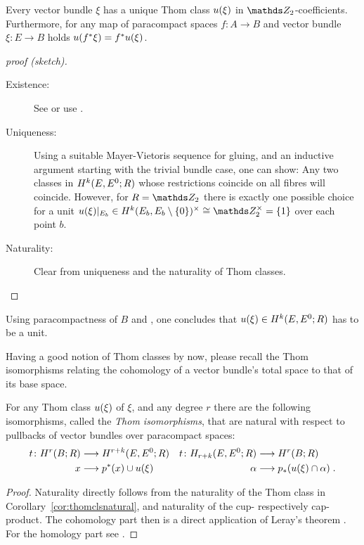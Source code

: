 \begin{Cor}
  Every vector bundle $\xi$ has a unique Thom class ${u}(\xi)$ in
  $\Zmod2$-coefficients.
  Furthermore, for any map of paracompact spaces $f\colon A\to B$ and
  vector bundle $\xi\colon E\to B$ holds ${u}({f}^* \xi) = {f}^* {u}(\xi)$.
  \begin{proof}[proof (sketch)]
    \begin{description}
    \item[Existence:] See \cite[Theorem~4D.10]{hatcher} or use
      \cite[Prop.~17.9.3]{tomdieck}.
    \item[Uniqueness:]
      Using a suitable Mayer-Vietoris sequence for gluing, and an
      inductive argument starting with the trivial bundle case, one can show:
      Any two classes in $H^{k}(E, {E}^0;R)$ whose
      restrictions coincide on all fibres will coincide.
      However, for $R=\Zmod2$ there is exactly one possible choice for
      a unit $\u{\xi}|_{E_b}\in
      \H^{\rkk}(\spherepair{E_b})^\times\cong\Zmod2^\times=\{1\}$
      over each point $b$.
    \item[Naturality:] Clear from uniqueness and the naturality of Thom classes.
    \end{description}
  \end{proof}
\end{Cor}

\begin{Rem}
  Using paracompactness of $B$ and
  \cite[Proposition~17.9.6]{tomdieck}, one concludes that
  ${u}(\xi)\in H^{k}(E, {E}^0;R)$ has to be a unit.
\end{Rem}

Having a good notion of Thom classes by now, please recall the Thom
isomorphisms relating the cohomology of a vector bundle's total
space to that of its base space.
\begin{Thm}
  For any Thom class ${u}(\xi)$ of $\xi$, and any degree $r$ there are
  the following isomorphisms, called the \emph{Thom isomorphisms},
  that are natural with respect to pullbacks of vector bundles over
  paracompact spaces:
  \begin{align*}
    t\colon
    H^r(B;R) &\longrightarrow H^{r+k}(E, {E}^0; R)
    & t\colon
      H_{r+k}(E, {E}^0; R) &\longrightarrow H^r(B;R)
    \\
    x &\longrightarrow {p}^* (x) \cup {u}(\xi)
    & \alpha &\longrightarrow {p}_* ({u}(\xi) \cap \alpha)
               \;.
  \end{align*}
  \begin{proof}
    Naturality directly follows from the naturality of the Thom class
    in Corollary~\ref{cor:thomclsnatural}, and naturality of the cup-
    respectively cap-product.
    The cohomology part then is a direct application of Leray's theorem
    \cite[Theorem~4D.8]{hatcher}.
    For the homology part see \forexample \cite[Theorem~14.6]{switzer}.
  \end{proof}
\end{Thm}

